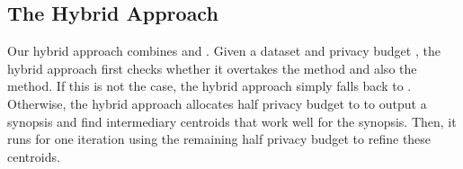 \begin{comment}
\begin{figure*}[p]
	\begin{tabular}{cc}
	\texttt{[image: s1-performance.eps]} & \texttt{[image: s1-performance-closeup.eps]}\\
	(a) S1 dataset & (b) S1 dataset, close-up at large \\
	\texttt{[image: gowalla-2d-performance.eps]} & \texttt{[image: gowalla-2d-performance-closeup.eps]}\\
	(c) Gowalla 2D dataset & (d) Gowalla 2D dataset, close-up at large \\
\texttt{[image: gowalla-3d-performance.eps]} & \texttt{[image: gowalla-3d-performance-closeup.eps]}\\
	(e) Gowalla 3D dataset & (f) Gowalla 3D dataset, close-up at large \\
	\end{tabular}
	\caption{The comparison of four algorithms proposed in this paper, by varying }\label{fig:exp-vary-epsilon}
\end{figure*}

\begin{figure*}[p]
\begin{minipage}[b]{0.45\linewidth}
\centering
\texttt{[image: regression-all-in-one.eps]}
\caption{The linear regression for empirically finding the  value.}\label{fig:regression}
\end{minipage}
\hspace{0.5cm}
\begin{minipage}[b]{0.45\linewidth}
\centering
\texttt{[image: ds1.10-scalability.eps]}\caption{The comparison of the UGkM and DPLloyd with varying dimensions.}\label{fig:exp-vary-N-dimension}
\end{minipage}
\end{figure*}
\end{comment}

\subsection{The Hybrid Approach}\label{ssec:hybrid}

Our hybrid approach combines \eugkm and \dpl. Given a dataset and privacy budget , the hybrid approach first \mbox{checks} whether it overtakes the \dpl method and also the \eugkm method. If this is not the case, the hybrid approach simply falls back to \eugkm. Otherwise, the hybrid approach allocates half privacy budget to \eugkm to output a synopsis and find  intermediary centroids that work well for the synopsis. Then, it runs \dpl for one iteration using the remaining half privacy budget to refine these  centroids.

